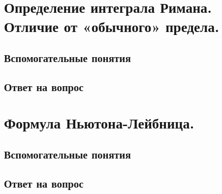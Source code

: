 \documentclass[12pt,a4paper]{article}
\begin{document}
\newpage
\section{Определение интеграла Римана. Отличие от «обычного» предела.}

\subsection*{Вспомогательные понятия}


\subsection*{Ответ на вопрос}


\newpage
\section{Формула Ньютона-Лейбница.}

\subsection*{Вспомогательные понятия}


\subsection*{Ответ на вопрос}

\end{document}
